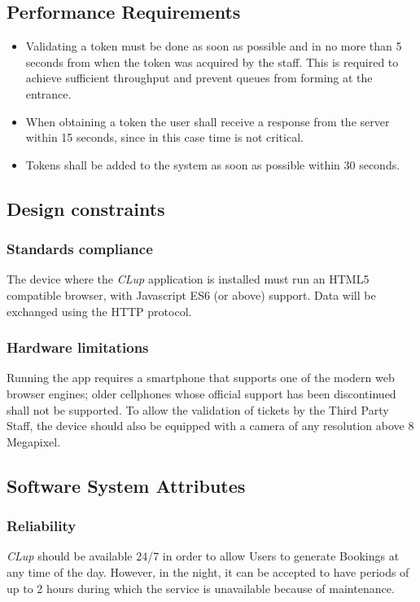 \subsection{Performance Requirements}
\begin{itemize} 
\item Validating a token must be done as soon as possible and in no more than 5 seconds from when the token was acquired by the staff. This is required to achieve sufficient throughput and prevent queues from forming at the entrance.
\item When obtaining a token the user shall receive a response from the server within 15 seconds, since in this case time is not critical.
\item Tokens shall be added to the system as soon as possible within 30 seconds.
\end{itemize}
\subsection{Design constraints}
\subsubsection{Standards compliance}
The device where the \emph{CLup} application is installed must run an HTML5 compatible browser, with Javascript ES6 (or above) support.
Data will be exchanged using the HTTP protocol.
\subsubsection{Hardware limitations}
Running the app requires a smartphone that supports one of the modern web browser engines; older cellphones whose official support has been discontinued shall not be supported.
To allow the validation of tickets by the Third Party Staff, the device should also be equipped with a camera of any resolution above 8 Megapixel.

\subsection{Software System Attributes}
\subsubsection{Reliability}
\textit{CLup} should be available 24/7 in order to allow Users to generate Bookings at any time of the day. However, in the night, it can be accepted to have periods of up to 2 hours during which the service is unavailable because of maintenance.
